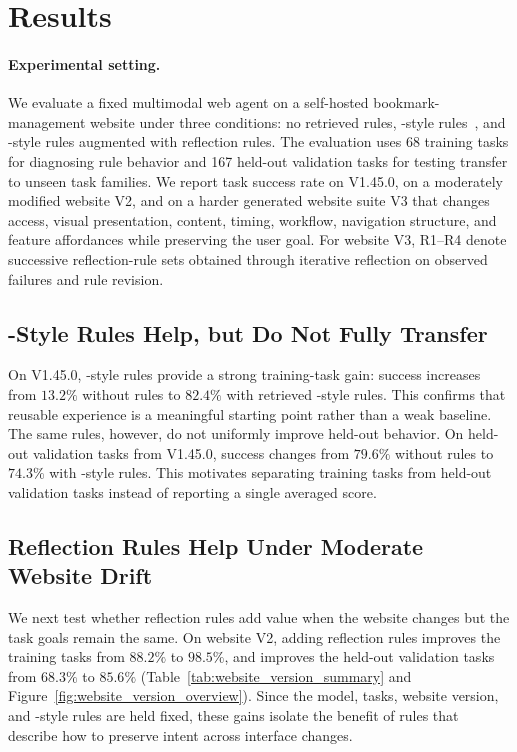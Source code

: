 \section{Results}



\paragraph{Experimental setting.}
We evaluate a fixed multimodal web agent on a self-hosted bookmark-management website under three conditions: no retrieved rules, \expel{}-style rules~\citep{zhao2023expel}, and \expel{}-style rules augmented with reflection rules. The evaluation uses 68 training tasks for diagnosing rule behavior and 167 held-out validation tasks for testing transfer to unseen task families. We report task success rate on \linkding{} V1.45.0, on a moderately modified website V2, and on a harder generated website suite V3 that changes access, visual presentation, content, timing, workflow, navigation structure, and feature affordances while preserving the user goal. For website V3, R1--R4 denote successive reflection-rule sets obtained through iterative reflection on observed failures and rule revision.

\subsection{\expel{}-Style Rules Help, but Do Not Fully Transfer}

On \linkding{} V1.45.0, \expel{}-style rules provide a strong training-task gain: success increases from \(13.2\%\) without rules to \(82.4\%\) with retrieved \expel{}-style rules. This confirms that reusable experience is a meaningful starting point rather than a weak baseline. The same rules, however, do not uniformly improve held-out behavior. On held-out validation tasks from \linkding{} V1.45.0, success changes from \(79.6\%\) without rules to \(74.3\%\) with \expel{}-style rules. This motivates separating training tasks from held-out validation tasks instead of reporting a single averaged score.

\subsection{Reflection Rules Help Under Moderate Website Drift}

We next test whether reflection rules add value when the website changes but the task goals remain the same. On website V2, adding reflection rules improves the training tasks from \(88.2\%\) to \(98.5\%\), and improves the held-out validation tasks from \(68.3\%\) to \(85.6\%\) (Table~\ref{tab:website_version_summary} and Figure~\ref{fig:website_version_overview}). Since the model, tasks, website version, and \expel{}-style rules are held fixed, these gains isolate the benefit of rules that describe how to preserve intent across interface changes.


